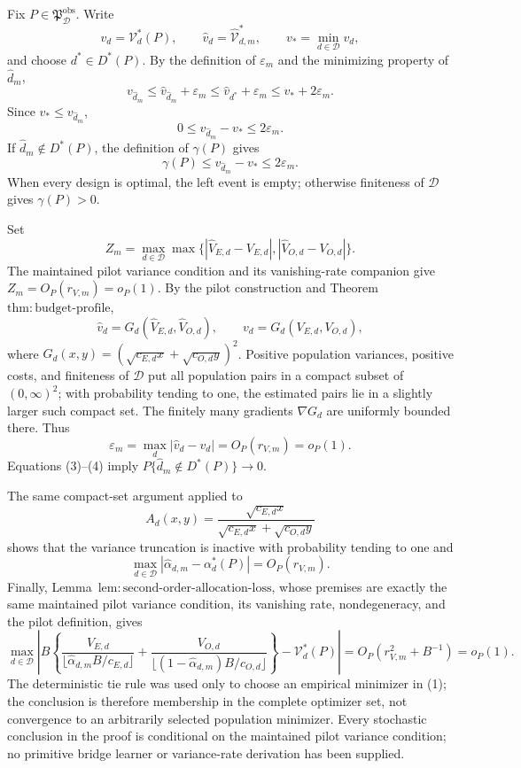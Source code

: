 Fix \(P\in\mathfrak P_{\mathcal D}^{\mathrm{obs}}\).  Write
\[
 v_d=\mathcal V_d^*(P),\qquad
 \widehat v_d=\widehat{\mathcal V}_{d,m}^*,
 \qquad v_*=\min_{d\in\mathcal D}v_d,
\]
and choose \(d^*\in D^*(P)\).  By the definition of \(\varepsilon_m\) and the minimizing property of \(\widehat d_m\),
\[
 v_{\widehat d_m}
 \le \widehat v_{\widehat d_m}+\varepsilon_m
 \le \widehat v_{d^*}+\varepsilon_m
 \le v_*+2\varepsilon_m. \tag{1}
\]
Since \(v_*\le v_{\widehat d_m}\),
\[
 0\le v_{\widehat d_m}-v_*\le2\varepsilon_m. \tag{2}
\]
If \(\widehat d_m\notin D^*(P)\), the definition of \(\gamma(P)\) gives
\[
 \gamma(P)\le v_{\widehat d_m}-v_*\le2\varepsilon_m. \tag{3}
\]
When every design is optimal, the left event is empty; otherwise finiteness of \(\mathcal D\) gives \(\gamma(P)>0\).

Set
\[
 Z_m=\max_{d\in\mathcal D}\max\{|\widehat V_{E,d}-V_{E,d}|,
 |\widehat V_{O,d}-V_{O,d}|\}.
\]
The maintained pilot variance condition and its vanishing-rate companion give \(Z_m=O_P(r_{V,m})=o_P(1)\).  By the pilot construction and Theorem~\(\mathrm{thm{:}budget\text{-}profile}\),
\[
 \widehat v_d=G_d(\widehat V_{E,d},\widehat V_{O,d}),
 \qquad v_d=G_d(V_{E,d},V_{O,d}),
\]
where \(G_d(x,y)=(\sqrt{c_{E,d}x}+\sqrt{c_{O,d}y})^2\).  Positive population variances, positive costs, and finiteness of \(\mathcal D\) put all population pairs in a compact subset of \((0,\infty)^2\); with probability tending to one, the estimated pairs lie in a slightly larger such compact set.  The finitely many gradients \(\nabla G_d\) are uniformly bounded there.  Thus
\[
 \varepsilon_m=\max_d|\widehat v_d-v_d|=O_P(r_{V,m})=o_P(1). \tag{4}
\]
Equations (3)--(4) imply \(P\{\widehat d_m\notin D^*(P)\}\to0\).

The same compact-set argument applied to
\[
 A_d(x,y)=\frac{\sqrt{c_{E,d}x}}
 {\sqrt{c_{E,d}x}+\sqrt{c_{O,d}y}}
\]
shows that the variance truncation is inactive with probability tending to one and
\[
 \max_{d\in\mathcal D}|\widehat\alpha_{d,m}-\alpha_d^*(P)|
 =O_P(r_{V,m}). \tag{5}
\]
Finally, Lemma~\(\mathrm{lem{:}second\text{-}order\text{-}allocation\text{-}loss}\), whose premises are exactly the same maintained pilot variance condition, its vanishing rate, nondegeneracy, and the pilot definition, gives
\[
\max_{d\in\mathcal D}\left|B\left\{
\frac{V_{E,d}}{\lfloor\widehat\alpha_{d,m}B/c_{E,d}\rfloor}
+\frac{V_{O,d}}{\lfloor(1-\widehat\alpha_{d,m})B/c_{O,d}\rfloor}
\right\}-\mathcal V_d^*(P)\right|
=O_P(r_{V,m}^2+B^{-1})=o_P(1).
\]
The deterministic tie rule was used only to choose an empirical minimizer in (1); the conclusion is therefore membership in the complete optimizer set, not convergence to an arbitrarily selected population minimizer.  Every stochastic conclusion in the proof is conditional on the maintained pilot variance condition; no primitive bridge learner or variance-rate derivation has been supplied.